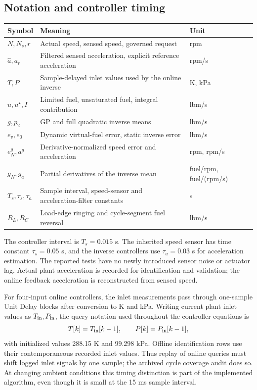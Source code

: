 \subsection{Notation and controller timing}
\begin{longtable}{@{}p{.16\linewidth}p{.54\linewidth}p{.23\linewidth}@{}}
\toprule Symbol & Meaning & Unit\\\midrule
$N,N_s,r$ & Actual speed, sensed speed, governed request & rpm\\
$\hat a,a_r$ & Filtered sensed acceleration, explicit reference acceleration & rpm/s\\
$T,P$ & Sample-delayed inlet values used by the online inverse & K, kPa\\
$u,u^\star,I$ & Limited fuel, unsaturated fuel, integral contribution & lbm/s\\
$g,p_2$ & GP and full quadratic inverse means & lbm/s\\
$e_v,e_0$ & Dynamic virtual-fuel error, static inverse error & lbm/s\\
$e_N^g,a^g$ & Derivative-normalized speed error and acceleration & rpm, rpm/s\\
$g_N,g_a$ & Partial derivatives of the inverse mean & fuel/rpm, fuel/(rpm/s)\\
$T_s,\tau_s,\tau_a$ & Sample interval, speed-sensor and acceleration-filter constants & s\\
$R_L,R_C$ & Load-edge ringing and cycle-segment fuel reversal & lbm/s\\
\bottomrule
\end{longtable}
The controller interval is $T_s=0.015$ s. The inherited speed sensor has time constant $\tau_s=0.05$ s, and the inverse controllers use $\tau_a=0.03$ s for acceleration estimation. The reported tests have no newly introduced sensor noise or actuator lag. Actual plant acceleration is recorded for identification and validation; the online feedback acceleration is reconstructed from sensed speed.

For four-input online controllers, the inlet measurements pass through one-sample Unit Delay blocks after conversion to K and kPa. Writing current plant inlet values as $T_{\rm in},P_{\rm in}$, the query notation used throughout the controller equations is
\begin{equation}
T[k]=T_{\rm in}[k-1],\qquad P[k]=P_{\rm in}[k-1],
\end{equation}
with initialized values 288.15 K and 99.298 kPa. Offline identification rows use their contemporaneous recorded inlet values. Thus replay of online queries must shift logged inlet signals by one sample; the archived cycle coverage audit does so. At changing ambient conditions this timing distinction is part of the implemented algorithm, even though it is small at the 15 ms sample interval.


